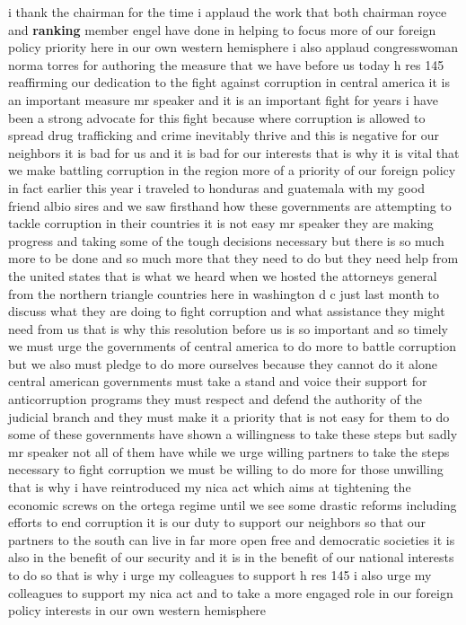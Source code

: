 \documentclass{article}
\begin{document}
\vspace{8mm}
i thank the chairman for the time i applaud the work that both chairman royce and {\bf \color{red} ranking} member engel have done in helping to focus more of our foreign policy priority here in our own western hemisphere i also applaud congresswoman norma torres for authoring the measure that we have before us today h res 145 reaffirming our dedication to the fight against corruption in central america it is an important measure mr speaker and it is an important fight for years i have been a strong advocate for this fight because where corruption is allowed to spread drug trafficking and crime inevitably thrive and this is negative for our neighbors it is bad for us and it is bad for our interests that is why it is vital that we make battling corruption in the region more of a priority of our foreign policy in fact earlier this year i traveled to honduras and guatemala with my good friend albio sires and we saw firsthand how these governments are attempting to tackle corruption in their countries it is not easy mr speaker they are making progress and taking some of the tough decisions necessary but there is so much more to be done and so much more that they need to do but they need help from the united states that is what we heard when we hosted the attorneys general from the northern triangle countries here in washington d c just last month to discuss what they are doing to fight corruption and what assistance they might need from us that is why this resolution before us is so important and so timely we must urge the governments of central america to do more to battle corruption but we also must pledge to do more ourselves because they cannot do it alone central american governments must take a stand and voice their support for anticorruption programs they must respect and defend the authority of the judicial branch and they must make it a priority that is not easy for them to do some of these governments have shown a willingness to take these steps but sadly mr speaker not all of them have while we urge willing partners to take the steps necessary to fight corruption we must be willing to do more for those unwilling that is why i have reintroduced my nica act which aims at tightening the economic screws on the ortega regime until we see some drastic reforms including efforts to end corruption it is our duty to support our neighbors so that our partners to the south can live in far more open free and democratic societies it is also in the benefit of our security and it is in the benefit of our national interests to do so that is why i urge my colleagues to support h res 145 i also urge my colleagues to support my nica act and to take a more engaged role in our foreign policy interests in our own western hemisphere\pagebreak
\end{document}
